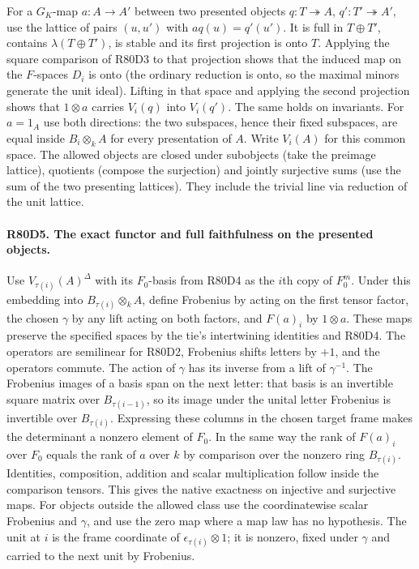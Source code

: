 For a $G_K$-map $a:A\to A'$ between two presented objects
$q:T\twoheadrightarrow A$, $q':T'\twoheadrightarrow A'$, use
the lattice of pairs $(u,u')$ with $a q(u)=q'(u')$. It is full in
$T\oplus T'$, contains $\lambda(T\oplus T')$, is stable and its
first projection is onto $T$. Applying the square comparison of
R80D3 to that projection shows that the induced map on the
$F$-spaces $D_i$ is onto (the ordinary reduction is onto, so
the maximal minors generate the unit ideal). Lifting in that
space and applying the second projection shows that $1\otimes a$
carries $V_i(q)$ into $V_i(q')$. The same holds on invariants.
For $a=1_A$ use both directions: the two subspaces, hence their
fixed subspaces, are equal inside $B_i\otimes_k A$ for every
presentation of $A$. Write $V_i(A)$ for this common space.
The allowed objects are closed under subobjects (take the preimage
lattice), quotients (compose the surjection) and jointly surjective
sums (use the sum of the two presenting lattices). They include
the trivial line via reduction of the unit lattice.

\paragraph{R80D5. The exact functor and full faithfulness on the presented objects.}
Use $V_{\tau(i)}(A)^\Delta$ with its $F_0$-basis from R80D4 as
the $i$th copy of $F_0^m$. Under this embedding into
$B_{\tau(i)}\otimes_k A$, define Frobenius by acting on the first
tensor factor, the chosen $\gamma$ by any lift acting on both
factors, and $F(a)_i$ by $1\otimes a$. These maps preserve the
specified spaces by the tie's intertwining identities and R80D4.
The operators are semilinear for R80D2, Frobenius shifts letters
by $+1$, and the operators commute. The action of $\gamma$ has
its inverse from a lift of $\gamma^{-1}$. The Frobenius images of
a basis span on the next letter: that basis is an invertible square
matrix over $B_{\tau(i-1)}$, so its image under the unital letter
Frobenius is invertible over $B_{\tau(i)}$. Expressing these columns
in the chosen target frame makes the determinant a nonzero element
of $F_0$. In the same way the rank of $F(a)_i$ over $F_0$ equals
the rank of $a$ over $k$ by comparison over the nonzero ring
$B_{\tau(i)}$. Identities, composition, addition and scalar
multiplication follow inside the comparison tensors. This gives
the native exactness on injective and surjective maps. For objects
outside the allowed class use the coordinatewise scalar Frobenius
and $\gamma$, and use the zero map where a map law has no
hypothesis. The unit at $i$ is the frame coordinate of
$\epsilon_{\tau(i)}\otimes1$; it is nonzero, fixed under $\gamma$
and carried to the next unit by Frobenius.

